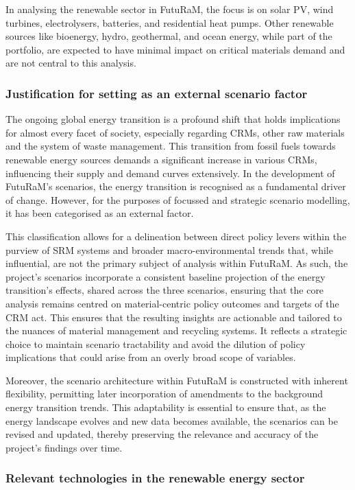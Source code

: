 In analysing the renewable sector in FutuRaM, the focus is on solar PV, wind turbines, electrolysers, batteries, and residential heat pumps. Other renewable sources like bioenergy, hydro, geothermal, and ocean energy, while part of the portfolio, are expected to have minimal impact on critical materials demand and are not central to this analysis.

\subsubsection{Justification for setting as an external scenario factor}

The ongoing global energy transition is a profound shift that holds implications for almost every facet of society, especially regarding CRMs, other raw materials and the system of waste management. This transition from fossil fuels towards renewable energy sources demands a significant increase in various CRMs, influencing their supply and demand curves extensively. In the development of FutuRaM's scenarios, the energy transition is recognised as a fundamental driver of change. However, for the purposes of focussed and strategic scenario modelling, it has been categorised as an external factor.

This classification allows for a delineation between direct policy levers within the purview of SRM systems and broader macro-environmental trends that, while influential, are not the primary subject of analysis within FutuRaM. As such, the project's scenarios incorporate a consistent baseline projection of the energy transition's effects, shared across the three scenarios, ensuring that the core analysis remains centred on material-centric policy outcomes and targets of the CRM act. This ensures that the resulting insights are actionable and tailored to the nuances of material management and recycling systems. It reflects a strategic choice to maintain scenario tractability and avoid the dilution of policy implications that could arise from an overly broad scope of variables.

Moreover, the scenario architecture within FutuRaM is constructed with inherent flexibility, permitting later incorporation of amendments to the background energy transition trends. This adaptability is essential to ensure that, as the energy landscape evolves and new data becomes available, the scenarios can be revised and updated, thereby preserving the relevance and accuracy of the project's findings over time.


\subsubsection{Relevant technologies in the renewable energy sector}


